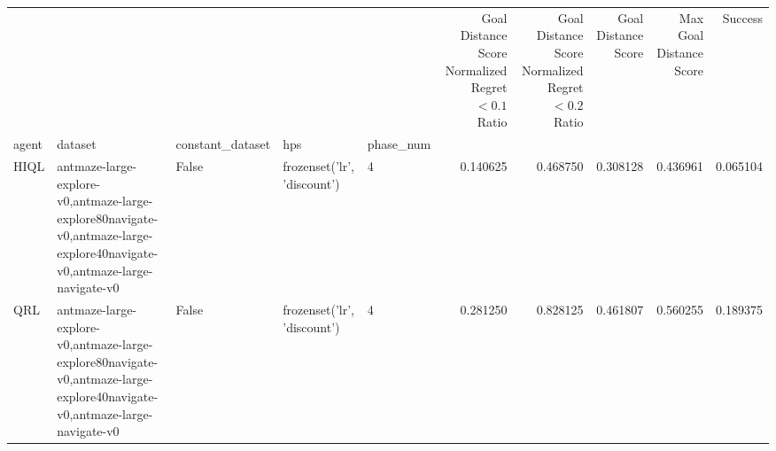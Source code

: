 \begin{tabular}{lllllrrrrr}
\toprule
 &  &  &  &  & Goal Distance Score Normalized Regret $< 0.1$ Ratio & Goal Distance Score Normalized Regret $< 0.2$ Ratio & Goal Distance Score & Max Goal Distance Score & Success \\
agent & dataset & constant_dataset & hps & phase_num &  &  &  &  &  \\
\midrule
HIQL & antmaze-large-explore-v0,antmaze-large-explore80navigate-v0,antmaze-large-explore40navigate-v0,antmaze-large-navigate-v0 & False & frozenset({'lr', 'discount'}) & 4 & 0.140625 & 0.468750 & 0.308128 & 0.436961 & 0.065104 \\
\cline{1-10} \cline{2-10} \cline{3-10} \cline{4-10}
QRL & antmaze-large-explore-v0,antmaze-large-explore80navigate-v0,antmaze-large-explore40navigate-v0,antmaze-large-navigate-v0 & False & frozenset({'lr', 'discount'}) & 4 & 0.281250 & 0.828125 & 0.461807 & 0.560255 & 0.189375 \\
\cline{1-10} \cline{2-10} \cline{3-10} \cline{4-10}
\bottomrule
\end{tabular}
